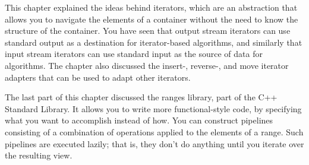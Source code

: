 This chapter explained the ideas behind iterators, which are an abstraction that allows you to navigate the elements of a container without the need to know the structure of the container. You have seen that output stream iterators can use standard output as a destination for iterator-based algorithms, and similarly that input stream iterators can use standard input as the source of data for algorithms. The chapter also discussed the insert-, reverse-, and move iterator adapters that can be used to adapt other iterators.

The last part of this chapter discussed the ranges library, part of the C++ Standard Library. It allows you to write more functional-style code, by specifying what you want to accomplish instead of how. You can construct pipelines consisting of a combination of operations applied to the elements of a range. Such pipelines are executed lazily; that is, they don’t do anything until you iterate over the resulting view.